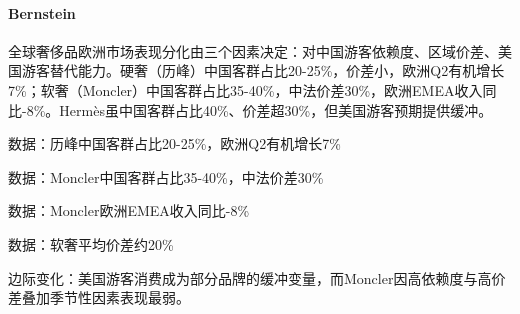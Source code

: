 \documentclass[11pt]{ctexart}
\begin{document}
\paragraph{Bernstein} 全球奢侈品欧洲市场表现分化由三个因素决定：对中国游客依赖度、区域价差、美国游客替代能力。硬奢（历峰）中国客群占比20-25\%，价差小，欧洲Q2有机增长7\%；软奢（Moncler）中国客群占比35-40\%，中法价差30\%，欧洲EMEA收入同比-8\%。Hermès虽中国客群占比40\%、价差超30\%，但美国游客预期提供缓冲。
{\small\color{refgray}数据：历峰中国客群占比20-25\%，欧洲Q2有机增长7\%\par}
{\small\color{refgray}数据：Moncler中国客群占比35-40\%，中法价差30\%\par}
{\small\color{refgray}数据：Moncler欧洲EMEA收入同比-8\%\par}
{\small\color{refgray}数据：软奢平均价差约20\%\par}
{\small\color{refgray}边际变化：美国游客消费成为部分品牌的缓冲变量，而Moncler因高依赖度与高价差叠加季节性因素表现最弱。\par}
\end{document}
